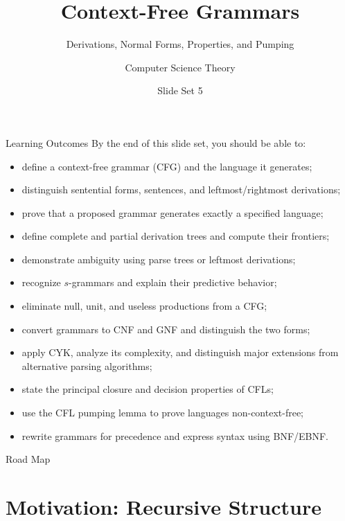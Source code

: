 \documentclass[10pt]{beamer}
\title{Context-Free Grammars}
\subtitle{Derivations, Normal Forms, Properties, and Pumping}
\author{Computer Science Theory}
\date{Slide Set 5}
\begin{document}
\begin{frame}
  \titlepage
\end{frame}

\begin{frame}{Learning Outcomes}
  \small
  By the end of this slide set, you should be able to:
  \begin{itemize}
    \item define a context-free grammar (CFG) and the language it generates;
    \item distinguish sentential forms, sentences, and leftmost/rightmost derivations;
    \item prove that a proposed grammar generates exactly a specified language;
    \item define complete and partial derivation trees and compute their frontiers;
    \item demonstrate ambiguity using parse trees or leftmost derivations;
    \item recognize $s$-grammars and explain their predictive behavior;
    \item eliminate null, unit, and useless productions from a CFG;
    \item convert grammars to CNF and GNF and distinguish the two forms;
    \item apply CYK, analyze its complexity, and distinguish major extensions
      from alternative parsing algorithms;
    \item state the principal closure and decision properties of CFLs;
    \item use the CFL pumping lemma to prove languages non-context-free;
    \item rewrite grammars for precedence and express syntax using BNF/EBNF.
  \end{itemize}
\end{frame}

\begin{frame}{Road Map}
  \tableofcontents
\end{frame}

\section{Motivation: Recursive Structure}
\end{document}
